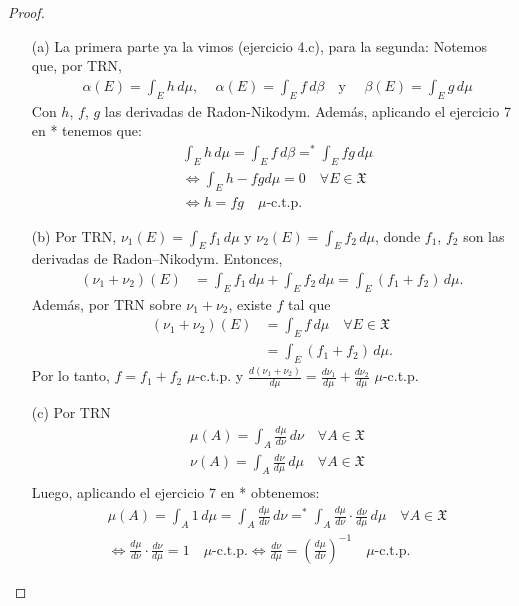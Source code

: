 \documentclass[12pt]{article}
\begin{document}
\begin{proof}
    \begin{itemize}
        \item[(a)] La primera parte ya la vimos (ejercicio 4.c), para la segunda: Notemos que, por TRN, \begin{align*}
                   & \alpha(E) = \int_E h \, d\mu \text{, } \quad \alpha(E) = \int_E f \, d\beta \quad \text{y } \quad \beta(E) = \int_E g \, d\mu
              \end{align*}
              Con $h$, $f$, $g$ las derivadas de Radon-Nikodym. Además, aplicando el ejercicio 7 en * tenemos que: \begin{align*}
                   & \int_E h \, d\mu = \int_E f \, d\beta =^* \int_E f g \, d\mu  \\
                   & \iff \int_E h - fg d \mu = 0 \quad \forall E \in \mathfrak{X} \\
                   & \iff h = fg \quad \mu\text{-c.t.p.}
              \end{align*}
        \item[(b)] Por TRN, $\nu_1(E) = \int_E f_1 \, d\mu$ y $\nu_2(E) = \int_E f_2 \, d\mu$, donde $f_1$, $f_2$ son las derivadas de Radon–Nikodym. Entonces, \begin{align*}
                  (\nu_1 + \nu_2)(E) & = \int_E f_1 \, d\mu + \int_E f_2 \, d\mu = \int_E (f_1 + f_2) \, d\mu.
              \end{align*}
              Además, por TRN sobre $\nu_1 + \nu_2$, existe $f$ tal que \begin{align*}
                  (\nu_1 + \nu_2)(E) & = \int_E f \, d\mu \quad \forall E \in \mathfrak{X} \\
                                     & = \int_E (f_1 + f_2) \, d\mu.
              \end{align*}
              Por lo tanto, $f = f_1 + f_2$ $\mu$-c.t.p. y $\frac{d(\nu_1 + \nu_2)}{d\mu} = \frac{d\nu_1}{d\mu} + \frac{d\nu_2}{d\mu}$ $\mu$-c.t.p.
        \item[(c)] Por TRN \begin{align*}
                   & \mu(A) = \int_A \frac{d\mu}{d\nu} \, d\nu \quad \forall A \in \mathfrak{X} \\
                   & \nu(A) = \int_A \frac{d\nu}{d\mu} \, d\mu \quad \forall A \in \mathfrak{X} \\
              \end{align*} Luego, aplicando el ejercicio 7 en * obtenemos: \begin{align*}
                   & \mu(A) = \int_A 1 \, d\mu = \int_A \frac{d\mu}{d\nu} \, d\nu =^* \int_A \frac{d\mu}{d\nu} \cdot \frac{d\nu}{d\mu} \, d\mu \quad \forall A \in \mathfrak{X}        \\
                   & \iff \frac{d\mu}{d\nu} \cdot \frac{d\nu}{d\mu} = 1 \quad \mu\text{-c.t.p.} \iff \frac{d\nu}{d\mu} = \left( \frac{d\mu}{d\nu} \right)^{-1} \quad \mu\text{-c.t.p.}
              \end{align*}
    \end{itemize}
\end{proof}
\end{document}
